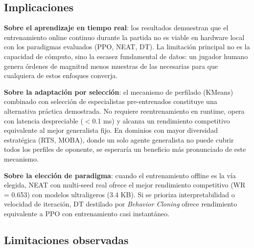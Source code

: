 \subsection{Implicaciones}

\textbf{Sobre el aprendizaje en tiempo real}: los resultados demuestran que el entrenamiento online continuo durante la partida no es viable en hardware local con los paradigmas evaluados (PPO, NEAT, DT). La limitación principal no es la capacidad de cómputo, sino la escasez fundamental de datos: un jugador humano genera órdenes de magnitud menos muestras de las necesarias para que cualquiera de estos enfoques converja.

\textbf{Sobre la adaptación por selección}: el mecanismo de perfilado (KMeans) combinado con selección de especialistas pre-entrenados constituye una alternativa práctica demostrada. No requiere reentrenamiento en runtime, opera con latencia despreciable ($<$0.1 ms) y alcanza un rendimiento competitivo equivalente al mejor generalista fijo. En dominios con mayor diversidad estratégica (RTS, MOBA), donde un solo agente generalista no puede cubrir todos los perfiles de oponente, se esperaría un beneficio más pronunciado de este mecanismo.

\textbf{Sobre la elección de paradigma}: cuando el entrenamiento offline es la vía elegida, NEAT con multi-seed real ofrece el mejor rendimiento competitivo (WR = 0.653) con modelos ultraligeros (3.4 KB). Si se prioriza interpretabilidad o velocidad de iteración, DT destilado por \textit{Behavior Cloning} ofrece rendimiento equivalente a PPO con entrenamiento casi instantáneo.

\subsection{Limitaciones observadas}

